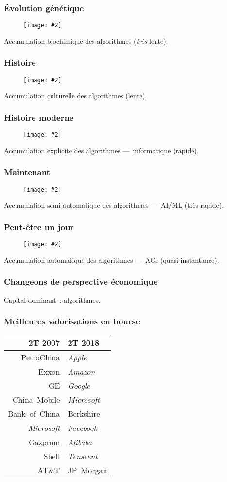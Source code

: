 \documentclass[10pt]{beamer}
\newcommand{\imgtw}[2][1]{%
  \begin{figure}%
    \centering%
    \texttt{[image: \#2]}%
  \end{figure}%
}
\newcommand{\imgth}[2][1]{%
  \begin{figure}%
    \centering%
    \texttt{[image: \#2]}%
  \end{figure}%
}
\begin{document}
\begin{frame}
  \frametitle{Évolution génétique}
  \imgth[.5]{ape}
  Accumulation biochimique des algorithmes (\emph{très} lente).
\end{frame}

\begin{frame}
  \frametitle{Histoire}
  \imgtw[.7]{tool-1}
  Accumulation culturelle des algorithmes (lente).
\end{frame}

\begin{frame}
  \frametitle{Histoire moderne}
  \imgtw[.7]{tool-2}
  Accumulation explicite des algorithmes ---~informatique (rapide).
\end{frame}

\begin{frame}
  \frametitle{Maintenant}
  \imgtw[.7]{alphago}
  Accumulation semi-automatique des algorithmes ---~AI/ML (très rapide).
\end{frame}

\begin{frame}
  \frametitle{Peut-être un jour}
  \imgtw[.9]{hal}
  Accumulation automatique des algorithmes ---~AGI (quasi instantanée).
\end{frame}

\begin{frame}
  \frametitle{Changeons de perspective économique}
  Capital dominant : algorithmes.
\end{frame}

\begin{frame}
  \frametitle{Meilleures valorisations en bourse}
  \centering
  \begin{tabular}{rl}
    \toprule
    2T 2007          & 2T 2018          \\
    \midrule
    PetroChina       & \emph{Apple}     \\
    Exxon            & \emph{Amazon}    \\
    GE               & \emph{Google}    \\
    China~Mobile     & \emph{Microsoft} \\
    Bank~of~China    & Berkshire        \\
    \emph{Microsoft} & \emph{Facebook}  \\
    Gazprom          & \emph{Alibaba}   \\
    Shell            & \emph{Tenscent}  \\
    AT\&T            & JP~Morgan        \\
    \bottomrule
  \end{tabular}
\end{frame}
\end{document}
